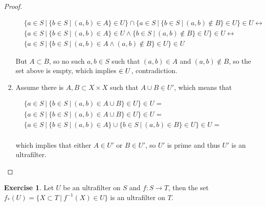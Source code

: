 \documentclass[8pt]{article}
\theoremstyle{definition}
\theoremstyle{definition}
\theoremstyle{definition}
\theoremstyle{definition}
\theoremstyle{definition}
\theoremstyle{definition}
\theoremstyle{definition}
\theoremstyle{definition}
\theoremstyle{definition}
\theoremstyle{definition}
\theoremstyle{definition}
\theoremstyle{definition}
\theoremstyle{definition}
\newtheorem{exercise}{Exercise}[section]
\theoremstyle{definition}
\theoremstyle{question}
\begin{document}
\begin{proof}
\begin{enumerate}
    $\begin{array}{lll}
      &\{ a \in S \: | \: \{ b \in S \:| \: (a, b) \in A \} \in U\} \cap \{ a \in S \: | \: \{ b \in S \: | \: (a, b) \notin B \} \in U \} \in U \leftrightarrow& \\
      &\{ a \in S \: | \: \{ b \in S \: | \: (a, b) \in A\} \in U \land \{ b \in S \: | \: (a, b) \notin B \} \in U \} \in U \leftrightarrow & \\
      &\{ a \in S \: | \: \{ b \in S \: | \: (a, b) \in A \land (a, b) \notin B \} \in U \} \in U &
    \end{array}$

    But $A \subset B$, so no such $a, b \in S$ such that $(a, b) \in A$ and $(a, b) \notin B$, so the set above is empty,
    which implies $\empty \in U$, contradiction.

    \item Assume there is $A, B \subset X \times X$ such that
    $A \cup B \in U'$, which means that
    \begin{center}
    $\begin{array}{lll}
    & \{ a \in S \: | \: \{ b \in S \:| \: (a, b) \in A \cup B \} \in U\} \in U = & \\
    & \{ a \in S \: | \: \{ b \in S \:| \: (a, b) \in A \cup B \} \in U\} \in U = & \\
    & \{ a \in S \: | \: \{ b \in S \:| \: (a, b) \in A \} \cup \{ b \in S \: | \: (a, b) \in B \} \in U\} \in U = & \\
    \end{array}$
    \end{center}
    which implies that either $A \in U'$ or $B \in U'$, so $U'$ is prime and thus $U'$ is an ultrafilter.
  \end{enumerate}
\end{proof}

\begin{exercise}
  Let $U$ be an ultrafilter on $S$ and $f : S \to T$, then the set $f_*(U) = \{ X \subset T \: | \: f^{-1}(X) \in U \}$ 
  is an ultrafilter on $T$.
\end{exercise}
\end{document}
